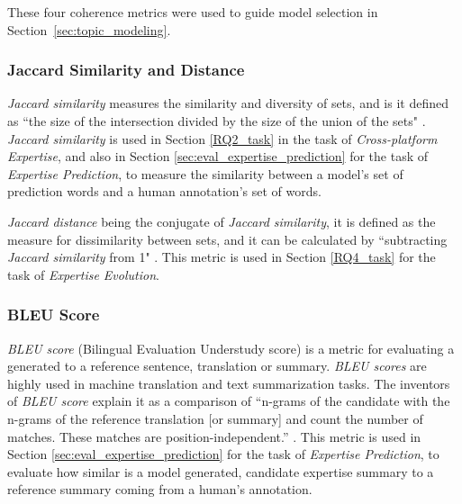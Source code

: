             These four coherence metrics were used to guide model selection in Section~\ref{sec:topic_modeling}.
        
        \subsubsection{Jaccard Similarity and Distance\label{background:jaccard}}
            \emph{Jaccard similarity} measures the similarity and diversity of sets, and is it defined as ``the size of the intersection divided by the size of the union of the sets" \cite{jaccard_wiki}. \emph{Jaccard similarity} is used in Section \ref{RQ2_task} in the task of \emph{Cross-platform Expertise}, and also in Section \ref{sec:eval_expertise_prediction} for the task of \emph{Expertise Prediction}, to measure the similarity between a model's set of prediction words and a human annotation's set of words.
            
            \emph{Jaccard distance} being the conjugate of \emph{Jaccard similarity}, it is defined as the measure for dissimilarity between sets, and it can be calculated by ``subtracting \emph{Jaccard similarity} from 1" \cite{jaccard_wiki}. This metric is used in Section \ref{RQ4_task} for the task of \emph{Expertise Evolution}.
        
        \subsubsection{BLEU Score}
            \emph{BLEU score} (Bilingual Evaluation Understudy score) is a metric for evaluating a generated to a reference sentence, translation or summary. \emph{BLEU scores} are highly used in machine translation and text summarization tasks. The inventors of \emph{BLEU score} explain it as a comparison of ``n-grams of the candidate with the n-grams of the reference translation [or summary] and count the number of matches. These matches are position-independent.'' \cite{papineni2002bleu}. This metric is used in Section \ref{sec:eval_expertise_prediction} for the task of \emph{Expertise Prediction}, to evaluate how similar is a model generated, candidate expertise summary to a reference summary coming from a human's annotation.
        
